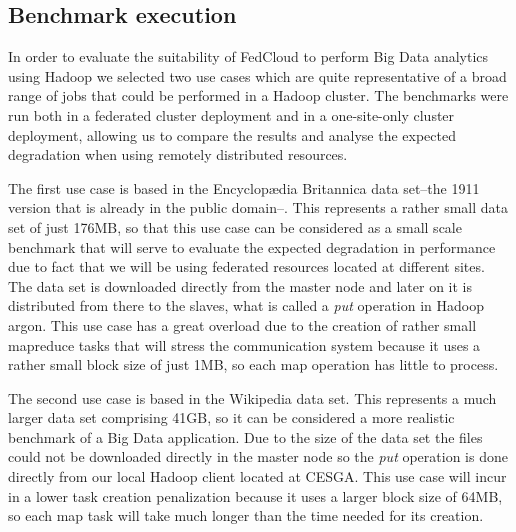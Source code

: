 \documentclass[oribibl]{llncs_Ibergrid2013}
\begin{document}


\subsection{Benchmark execution}
\label{ssect-execution}

In order to evaluate the suitability of FedCloud to perform Big Data analytics using Hadoop we selected two use cases which are quite representative of a broad range of jobs that could be performed in a Hadoop cluster. The benchmarks were run both in a federated cluster deployment and in a one-site-only cluster deployment, allowing us to compare the results and analyse the expected degradation when using remotely distributed resources.




The first use case is based in the Encyclop{\ae}dia Britannica\cite{britannica} data set--the 1911 version that is already in the public domain--. This represents a rather small data set of just 176MB, so that this use case can be considered as a small scale benchmark that will serve to evaluate the expected degradation in performance due to fact that we will be using federated resources located at different sites. The data set is downloaded directly from the master node and later on it is distributed from there to the slaves, what is called a \emph{put} operation in Hadoop argon. This use case has a great overload due to the creation of rather small mapreduce tasks that will stress the communication system because it uses a rather small block size of just 1MB, so each map operation has little to process.

The second use case is based in the Wikipedia\cite{wikipedia} data set. This represents a much larger data set comprising 41GB, so it can be considered a more realistic benchmark of a Big Data application. Due to the size of the data set the files could not be downloaded directly in the master node so the \emph{put} operation is done directly from our local Hadoop client located at CESGA. This use case will incur in a lower task creation penalization because it uses a larger block size of 64MB, so each map task will take much longer than the time needed for its creation.
\end{document}

